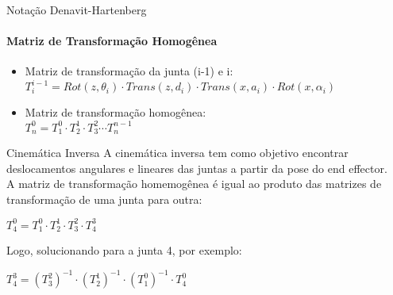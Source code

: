 \begin{frame}[c]{Notação Denavit-Hartenberg} 
    \framesubtitle{Matriz de Transformação Homogênea}
    \large{
    \begin{itemize}
        \item Matriz de transformação da junta (i-1) e i:\\
        \vspace{0.3cm}
        $T_{i}^{i-1}=Rot(z,\theta_{i})\cdot Trans(z,d_{i})\cdot Trans(x,a_{i})\cdot Rot(x,\alpha_{i})$\\
    \end{itemize}
    
    \begin{itemize}
        \item Matriz de transformação homogênea:\\
        \vspace{0.3cm}
        $T_{n}^{0}=T_{1}^{0}\cdot T_{2}^{1} \cdot T_{3}^{2} \cdots T_{n}^{n-1}$
    \end{itemize}
    }
\end{frame}
\begin{frame}[c]{Cinemática Inversa} 
    \large
    A cinemática inversa tem como objetivo encontrar deslocamentos angulares e lineares das juntas a partir da pose do end effector.\\%
    A matriz de transformação homemogênea é igual ao produto das matrizes de transformação de uma junta para outra:\\
    \vspace{.15cm}

    \begin{center}
        $T_{4}^{0}=T_{1}^{0}\cdot T_{2}^{1} \cdot T_{3}^{2} \cdot T_{4}^{3}$\\
    \end{center}

    \vspace{.15cm}
    Logo, solucionando para a junta 4, por exemplo:\\
    \vspace{.2cm}
    \begin{center}
        $T_{4}^{3}=(T_{3}^{2})^{-1} \cdot (T_{2}^{1})^{-1} \cdot (T_{1}^{0})^{-1} \cdot T_{4}^{0}$    
    \end{center}    
\end{frame}
